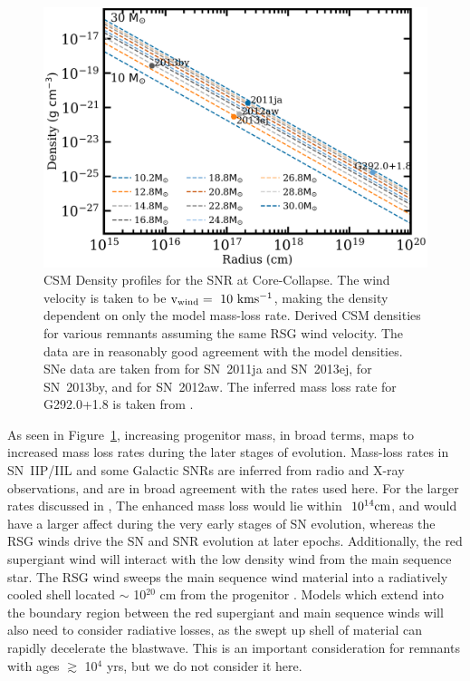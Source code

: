 \documentclass[twocolumn]{aastex631}
\begin{document}
\begin{figure}[hbt!]
    \centering
    \includegraphics[scale=0.17]{windplots.png}
    \caption{CSM Density profiles for the SNR at Core-Collapse. The wind velocity is taken to be $\rm v_{\rm wind}=~10~\rm kms^{-1}$, making the density dependent on only the model mass-loss rate. Derived CSM densities for various remnants assuming the same RSG wind velocity. The data are in reasonably good agreement with the model densities. SNe data are taken from \citet{chakraborti13,chakraborti16} for SN~2011ja and SN~2013ej, \citet{black17} for SN~2013by, and \citet{yadav14} for SN~2012aw. The inferred mass loss rate for G292.0+1.8 is taken from \citet{jjlee10}.}
    \label{fig:wind}
\end{figure}

As seen in Figure~\ref{fig:wind}, increasing progenitor mass, in broad terms, maps to increased mass loss rates during the later stages of evolution. Mass-loss rates in SN~IIP/IIL and some Galactic SNRs are inferred from radio and X-ray observations, and are in broad agreement with the rates used here. For the larger rates discussed in \citet{forster}, The enhanced mass loss would lie within $~10^{14} \rm cm$, and would have a larger affect during the very early stages of SN evolution, whereas the RSG winds drive the SN and SNR evolution at later epochs. Additionally, the red supergiant wind will interact with the low density wind from the main sequence star. The RSG wind sweeps the main sequence wind material into a radiatively cooled shell located $\sim$ 10$^{20}$ cm from the progenitor \citep{castor75}. Models which extend into the boundary region between the red supergiant and main sequence winds will also need to consider radiative losses, as the swept up shell of material can rapidly decelerate the blastwave. This is an important consideration for remnants with ages $\gtrsim$ 10$^{4}$ yrs, but we do not consider it here.
\end{document}
